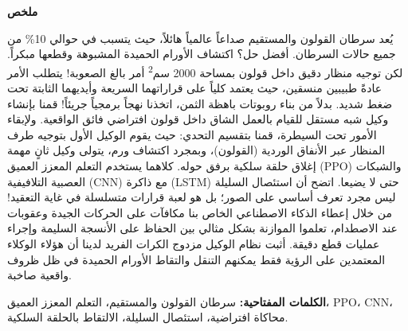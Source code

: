 \clearpage
\begin{Arabic}
\begin{center}
\textbf{\Large ملخص}
\end{center}
\vspace{0.2cm}
\indent يُعد سرطان القولون والمستقيم صداعاً عالمياً هائلاً، حيث يتسبب في حوالي \textenglish{10\%} من جميع حالات السرطان. أفضل حل؟ اكتشاف الأورام الحميدة المشبوهة وقطعها مبكراً. لكن توجيه منظار دقيق داخل قولون بمساحة \textenglish{2000} سم\textsuperscript{2} أمر بالغ الصعوبة! يتطلب الأمر عادةً طبيبين منسقين، حيث يعتمد كلياً على قراراتهما السريعة وأيديهما الثابتة تحت ضغط شديد. بدلاً من بناء روبوتات باهظة الثمن، اتخذنا نهجاً برمجياً جريئاً! قمنا بإنشاء وكيل شبه مستقل للقيام بالعمل الشاق داخل قولون افتراضي فائق الواقعية. ولإبقاء الأمور تحت السيطرة، قمنا بتقسيم التحدي: حيث يقوم الوكيل الأول بتوجيه طرف المنظار عبر الأنفاق الوردية (القولون)، وبمجرد اكتشاف ورم، يتولى وكيل ثانٍ مهمة إغلاق حلقة سلكية برفق حوله. كلاهما يستخدم التعلم المعزز العميق (\textenglish{PPO}) والشبكات العصبية التلافيفية (\textenglish{CNN}) مع ذاكرة (\textenglish{LSTM}) حتى لا يضيعا. اتضح أن استئصال السليلة ليس مجرد تعرف أساسي على الصور؛ بل هو لعبة قرارات متسلسلة في غاية التعقيد! من خلال إعطاء الذكاء الاصطناعي الخاص بنا مكافآت على الحركات الجيدة وعقوبات عند الاصطدام، تعلموا الموازنة بشكل مثالي بين الحفاظ على الأنسجة السليمة وإجراء عمليات قطع دقيقة. أثبت نظام الوكيل مزدوج الكرات الفريد لدينا أن هؤلاء الوكلاء المعتمدين على الرؤية فقط يمكنهم التنقل والتقاط الأورام الحميدة في ظل ظروف واقعية صاخبة.

\vspace{0.5cm}
\noindent\textbf{الكلمات المفتاحية:} سرطان القولون والمستقيم، التعلم المعزز العميق، \textenglish{PPO}، \textenglish{CNN}، محاكاة افتراضية، استئصال السليلة، الالتقاط بالحلقة السلكية.
\end{Arabic}

\clearpage